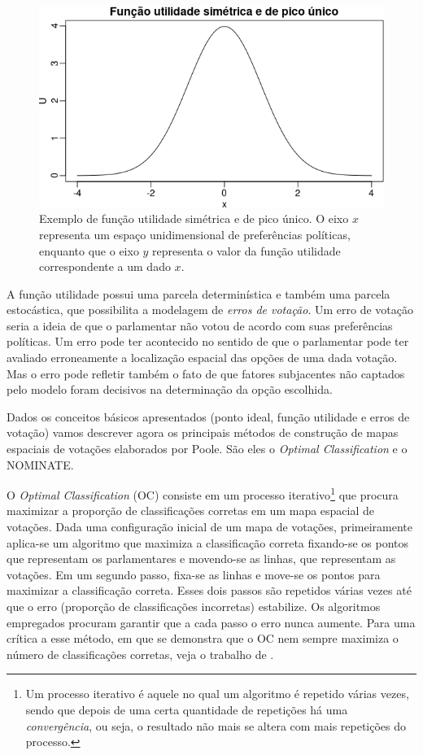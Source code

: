 \documentclass[
	article,			%
	12pt,				%
    twoside,			%
	a4paper,			%
	english,			%
	french,				%
	spanish,			%
	brazil,				%
	]{abntex2}
\begin{document}
\begin{figure}[h!]
  \centering
  \includegraphics[scale=0.6]{figs/funcao_utilidade.png}
  \caption{Exemplo de função utilidade simétrica e de pico único. O eixo $x$ representa um espaço unidimensional de preferências políticas, enquanto que o eixo $y$ representa o valor da função utilidade correspondente a um dado $x$.}
  \label{fig:funcao_utilidade}
\end{figure}

A função utilidade possui uma parcela determinística e também uma parcela estocástica, que possibilita a modelagem de \emph{erros de votação}. Um erro de votação seria a ideia de que o parlamentar não votou de acordo com suas preferências políticas. Um erro pode ter acontecido no sentido de que o parlamentar pode ter avaliado erroneamente a localização espacial das opções de uma dada votação. Mas o erro pode refletir também o fato de que fatores subjacentes não captados pelo modelo foram decisivos na determinação da opção escolhida.

Dados os conceitos básicos apresentados (ponto ideal, função utilidade e erros de votação) vamos descrever agora os principais métodos de construção de mapas espaciais de votações elaborados por Poole. São eles o \emph{Optimal Classification} e o NOMINATE.

O \emph{Optimal Classification} (OC) consiste em um processo iterativo\footnote{Um processo iterativo é aquele no qual um algoritmo é repetido várias vezes, sendo que depois de uma certa quantidade de repetições há uma \emph{convergência}, ou seja, o resultado não mais se altera com mais repetições do processo.} que procura maximizar a proporção de classificações corretas em um mapa espacial de votações. Dada uma configuração inicial de um mapa de votações, primeiramente aplica-se um algoritmo que maximiza a classificação correta fixando-se os pontos que representam os parlamentares e movendo-se as linhas, que representam as votações. Em um segundo passo, fixa-se as linhas e move-se os pontos para maximizar a classificação correta. Esses dois passos são repetidos várias vezes até que o erro (proporção de classificações incorretas) estabilize. Os algoritmos empregados procuram garantir que a cada passo o erro nunca aumente. Para uma crítica a esse método, em que se demonstra que o OC nem sempre maximiza o número de classificações corretas, veja o trabalho de .
\end{document}
